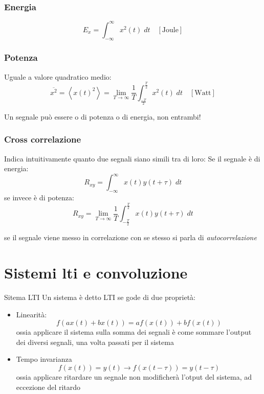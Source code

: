 \subsubsection*{Energia}
\[
	E_x = \int_{-\infty }^{\infty } x^2 \left(t\right) \; dt \quad \left[\text{Joule}\right]
\]
\subsubsection*{Potenza}
Uguale a valore quadratico medio:
\[
	\overline{x^2 } = \left<x\left(t\right)^2 \right> = \lim_{T \to \infty} \frac{1}{T} \int_{\frac{-T}{2}}^{\frac{T}{2}} x^2 \left(t\right) \; dt \quad \left[\text{Watt}\right]
\]

Un segnale può essere o di potenza o di energia, non entrambi!

\subsubsection*{Cross correlazione}
Indica intuitivamente quanto due segnali siano simili tra di loro:
\vskip3mm
Se il segnale è di energia:
\[
	R_{xy} = \int_{-\infty }^{\infty } x\left(t\right) y \left(t + \tau \right) \; dt
\]
se invece è di potenza:
\[
	R_{xy} = \lim_{T \to \infty} \frac{1}{T}\int_{-\frac{T}{2} }^{\frac{T}{2} } x\left(t\right) y \left(t + \tau \right) \; dt
\]

se il segnale viene messo in correlazione con se stesso si parla di \textit{autocorrelazione}

\section{Sistemi lti e convoluzione}
\begin{definizione}{Sitema LTI}
	Un sistema è detto LTI se gode di due proprietà:
	\begin{itemize}
		\item Linearità:
		      \[
			      f\left(ax\left(t\right) + bx\left(t\right)\right) = af\left(x\left(t\right)\right) + bf\left(x\left(t\right)\right)
		      \]
		      ossia applicare il sistema sulla somma dei segnali è come sommare l'output dei diversi segnali, una volta passati per il sistema
		\item Tempo invarianza
		      \[
			      f\left(x\left(t\right)\right) = y\left(t\right) \rightarrow f\left(x\left(t- \tau \right)\right) = y\left(t-\tau \right)
		      \]
		      ossia applicare ritardare un segnale non modificherà l'otput del sistema, ad eccezione del ritardo
	\end{itemize}
\end{definizione}

